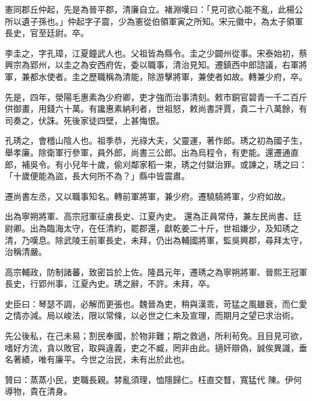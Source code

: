 \begin{pinyinscope}
 憲同郡丘仲起，先是為晉平郡，清廉自立。褚淵嘆曰：「見可欲心能不亂，此楊公所以遺子孫也。」仲起字子震，少為憲從伯領軍寅之所知。宋元徽中，為太子領軍長史，官至廷尉。卒。



 李圭之，字孔璋，江夏鐘武人也。父祖皆為縣令。圭之少闢州從事。宋泰始初，蔡興宗為郢州，以圭之為安西府佐，委以職事，清治見知。遷鎮西中郎諮議，右軍將軍，兼都水使者。圭之歷職稱為清能，除游擊將軍，兼使者如故。轉兼少府，卒。



 先是，四年，滎陽毛惠素為少府卿，吏才強而治事清刻。敕市銅官碧青一千二百斤供御畫，用錢六十萬。有讒惠素納利者，世祖怒，敕尚書評賈，貴二十八萬餘，有司奏之，伏誅。死後家徒四壁，上甚悔恨。



 孔琇之，會稽山陰人也。祖季恭，光祿大夫，父靈運，著作郎。琇之初為國子生，舉孝廉。除衛軍行參軍，員外郎，尚書三公郎。出為烏程令，有吏能。還遷通直郎，補吳令。有小兒年十歲，偷刈鄰家稻一束，琇之付獄治罪。或諫之，琇之曰：「十歲便能為盜，長大何所不為？」縣中皆震肅。



 遷尚書左丞，又以職事知名。轉前軍將軍，兼少府。遷驍騎將軍，少府如故。



 出為寧朔將軍、高宗冠軍征虜長史、江夏內史。
 還為正員常侍，兼左民尚書、廷尉卿。出為臨海太守，在任清約，罷郡還，獻乾姜二十斤，世祖嫌少，及知琇之清，乃嘆息。除武陵王前軍長史，未拜，仍出為輔國將軍，監吳興郡，尋拜太守，治稱清嚴。



 高宗輔政，防制諸蕃，致密旨於上佐。隆昌元年，遷琇之為寧朔將軍、晉熙王冠軍長史，行郢州事，江夏內史。琇之辭，不許。未拜，卒。



 史臣曰：琴瑟不調，必解而更張也。魏晉為吏，稍與漢乖，苛猛之風雖衰，而仁愛之情亦減。局以峻法，限以常條，以必世之仁未及宣理，而期月之望已求治術。



 先公後私，在己未易；割民奉國，於物非難；期之救過，所利茍免。且目見可欲，嗜好方流，貪以敗官，取與違義，吏之不臧，罔非由此。擿奸辯偽，誠俟異識，垂名著績，唯有廉平。今世之治民，未有出於此也。



 贊曰：蒸蒸小民，吏職長親。棼亂須理，恤隱歸仁。枉直交瞀，寬猛代
 陳。伊何導物，貴在清身。



\end{pinyinscope}